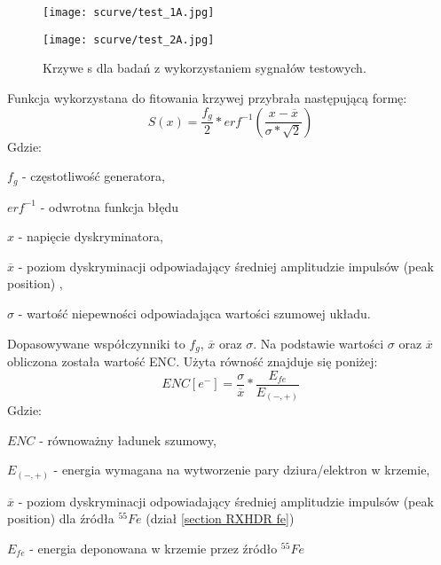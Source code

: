 \begin{figure}
        \centering
        \begin{multicols}{2}
                \texttt{[image: scurve/test\_1A.jpg]} \par
                \texttt{[image: scurve/test\_2A.jpg]} \par
        \end{multicols}
        \caption{Krzywe s dla badań z wykorzystaniem sygnałów testowych.}\label{s curve test}
\end{figure}

Funkcja wykorzystana do fitowania krzywej przybrała następującą formę:
\begin{equation}
        \label{test eq}
        S(x) = \frac{f_g}{2} * erf^{-1}(\frac{x-\overline{x}}{\sigma*\sqrt{2}})
\end{equation}
Gdzie:
\begin{description}
        \item $f_g$ - częstotliwość generatora,
        \item $erf^{-1}$ - odwrotna funkcja błędu
        \item $x$ - napięcie dyskryminatora,
        \item $\overline{x}$ - poziom dyskryminacji odpowiadający średniej amplitudzie impulsów (peak position) ,
        \item  $\sigma$ - wartość niepewności odpowiadająca wartości szumowej układu. 
\end{description}

Dopasowywane współczynniki to $f_g$, $\overline{x}$ oraz $\sigma$. Na podstawie wartości $\sigma$ oraz $\overline{x}$ obliczona została wartość ENC. Użyta równość znajduje się poniżej:
\begin{equation}
        ENC [e^-] = \frac{\sigma}{\overline{x}} * \frac{E_{fe}}{E_{(-,+)}}
\end{equation}
Gdzie:
\begin{description}
        \item $ENC$  - równoważny ładunek szumowy,
        \item $E_{(-,+)}$ - energia wymagana na wytworzenie pary dziura/elektron w krzemie,
        \item $\overline{x}$ - poziom dyskryminacji odpowiadający średniej amplitudzie impulsów (peak position) dla źródła ${}^{55}Fe$ (dział \ref{section RXHDR fe})
        \item $E_{fe}$ -  energia deponowana w krzemie przez źródło ${}^{55}Fe$
\end{description}

